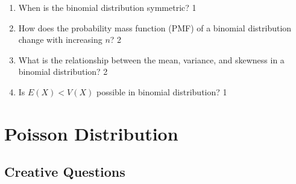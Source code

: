 \documentclass[a4paper,oneside, margin=1.4in]{book}
\begin{document}
\begin{enumerate}
\item When is the binomial distribution symmetric? \hfill 1

\item How does the probability mass function (PMF) of a binomial distribution change with increasing \( n \)? \hfill 2

\item What is the relationship between the mean, variance, and skewness in a binomial distribution? \hfill 2

\item Is $E(X) < V(X)$ possible in binomial distribution? \hfill 1


 \end{enumerate}

\chapter{Poisson Distribution} 
\section{Creative Questions}
\end{document}
